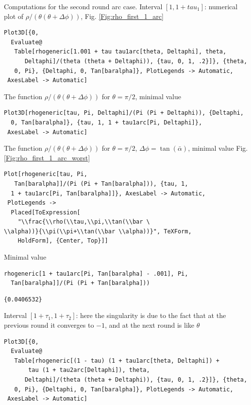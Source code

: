 \documentclass[reqno]{amsart}
\theoremstyle{definition} \newtheorem{definition}{Definition}[section]
\theoremstyle{definition} \newtheorem{remark}[definition]{Remark}
\theoremstyle{plain} \newtheorem{lemma}[definition]{Lemma}
\theoremstyle{plain} \newtheorem{proposition}[definition]{Proposition}
\theoremstyle{plain} \newtheorem{theorem}[definition]{Theorem}
\theoremstyle{plain} \newtheorem{corollary}[definition]{Corollary}
\theoremstyle{definition} \newtheorem{example}[definition]{Example}
\theoremstyle{plain} \newtheorem{claim}[clai]{Claim}
\theoremstyle{definition} \newtheorem{assumption}[definition]{Assumption}
\theoremstyle{definition} \newtheorem{observation}[definition]{Observation}
\newcommand{\1}{\mathbbm 1}
\newcommand{\smed}{\medskip}
\numberwithin{equation}{section} %
\theoremstyle{plain} \newtheorem*{theorem*}{Theorem}
\theoremstyle{plain} \newtheorem{mthm}[maintheorem]{Main Theorem}
\theoremstyle{plain} \newtheorem*{mthm*}{Main Theorem}
\theoremstyle{plain} \newtheorem*{conjecture*}{Conjecture}
\theoremstyle{plain} \newtheorem{conjecture}[definition]{Conjecture}
\theoremstyle{plain} \newtheorem*{problem*}{Problem}
\begin{document}
\smed
Computations for the second round arc case. Interval $[1,1+tau_1]$: numerical plot of $\rho/(\theta(\theta + \Delta \phi))$, Fig. \ref{Fig:rho_first_1_arc}
\smed
\begin{verbatim}
Plot3D[{0, 
  Evaluate@
   Table[rhogeneric[1.001 + tau tau1arc[theta, Deltaphi], theta, 
      Deltaphi]/(theta (theta + Deltaphi)), {tau, 0, 1, .2}]}, {theta,
   0, Pi}, {Deltaphi, 0, Tan[baralpha]}, PlotLegends -> Automatic, 
 AxesLabel -> Automatic]
\end{verbatim}
\smed
The function $\rho/(\theta(\theta + \Delta \phi))$ for $\theta = \pi/2$, minimal value
\smed
\begin{verbatim}
Plot3D[rhogeneric[tau, Pi, Deltaphi]/(Pi (Pi + Deltaphi)), {Deltaphi, 
  0, Tan[baralpha]}, {tau, 1, 1 + tau1arc[Pi, Deltaphi]}, 
 AxesLabel -> Automatic]
\end{verbatim}
\smed
The function $\rho/(\theta(\theta + \Delta \phi))$ for $\theta = \pi/2$, $\Delta \phi = \tan(\bar \alpha)$, minimal value Fig. \ref{Fig:rho_first_1_arc_worst}
\smed
\begin{verbatim}
Plot[rhogeneric[tau, Pi, 
   Tan[baralpha]]/(Pi (Pi + Tan[baralpha])), {tau, 1, 
  1 + tau1arc[Pi, Tan[baralpha]]}, AxesLabel -> Automatic, 
 PlotLegends -> 
  Placed[ToExpression[
    "\\frac{\\rho(\\tau,\\pi,\\tan(\\bar \
\\alpha))}{\\pi(\\pi+\\tan(\\bar \\alpha))}", TeXForm, 
    HoldForm], {Center, Top}]]
\end{verbatim}
\smed
Minimal value
\smed
\begin{verbatim}
rhogeneric[1 + tau1arc[Pi, Tan[baralpha] - .001], Pi, 
  Tan[baralpha]]/(Pi (Pi + Tan[baralpha]))
\end{verbatim}
\begin{verbatim}
{0.0406532}
\end{verbatim}
\smed
Interval $[1 + \tau_1,1 + \tau_2]$: here the singularity is due to the fact that at the previous round it converges to $-1$, and at the next round is like $\theta$
\smed
\begin{verbatim}
Plot3D[{0, 
  Evaluate@
   Table[rhogeneric[(1 - tau) (1 + tau1arc[theta, Deltaphi]) + 
       tau (1 + tau2arc[Deltaphi]), theta, 
      Deltaphi]/(theta (theta + Deltaphi)), {tau, 0, 1, .2}]}, {theta,
   0, Pi}, {Deltaphi, 0, Tan[baralpha]}, PlotLegends -> Automatic, 
 AxesLabel -> Automatic]
\end{verbatim}
\end{document}
